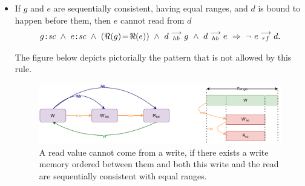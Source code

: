 \begin{itemize}
                \item If $g$ and $e$ are sequentially consistent, having equal ranges, and $d$ is bound to happen before them, then $e$ cannot read from $d$
                    \begin{align*}
                        \et{g}{sc}\ \wedge\ \et{e}{sc}  
                        \ \wedge \ (\Re(g) \!= \!\Re(e)) 
                        \ \wedge \ \reln{d}{hb}{g} 
                        \ \wedge \ \reln{d}{hb}{e}
                        \ \Rightarrow \ 
                        \neg \ \reln{e}{rf}{d}.
                    \end{align*}

                    The figure below depicts pictorially the pattern that is not allowed by this rule.
                    \begin{figure}[H]
                        \centering 
                        \includegraphics[scale=0.7]{ECMAScriptMemoryModel/SequentialAtomics3.pdf}
                        \caption{A read value cannot come from a write, if there exists a write memory ordered between them and both this write and the read are sequentially consistent with equal ranges.}
                    \end{figure}
                        
            \end{itemize}